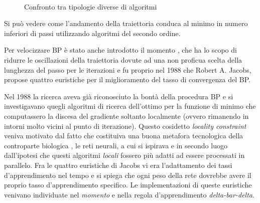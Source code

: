 \begin{figure}[hbtb]
\centering
{} \quad
{} \\
\caption{Confronto tra tipologie diverse di algoritmi}
\label{fig:subfig}
\end{figure}


Si può vedere come l'andamento della traiettoria conduca al minimo in numero inferiori di passi utilizzando algoritmi del secondo ordine.

Per velocizzare BP è stato anche introdotto il momento , che ha lo scopo di ridurre le oscillazioni della traiettoria dovute ad una non proficua scelta della lunghezza del passo per le iterazioni e fu proprio nel 1988 che Robert A. Jacobs, propose quattro euristiche per il miglioramento del tasso di convergenza del BP.

Nel 1988 la ricerca aveva già riconosciuto la bontà della procedura BP e si investigavano quegli algoritmi di ricerca dell'ottimo per la funzione di minimo che computassero la discesa del gradiente soltanto localmente (ovvero rimanendo in intorni molto vicini al punto di iterazione). Questo cosidetto \textit{locality constraint} veniva motivato dal fatto che costituiva una buona metafora tecnologica della controparte biologica , le reti neurali, a cui si ispirava e in secondo luogo dall'ipotesi che questi algoritmi \textit{locali} fossero più adatti ad essere processati in parallelo.
Fra le quattro euristiche di Jacobs vi era l'adattamento dei tassi d'apprendimento nel tempo e si spiega che ogni peso della rete dovrebbe avere il proprio tasso d'apprendimento specifico. Le implementazioni di queste euristiche venivano individuate nel \textit{momento} e nella regola d'apprendimento \textit{delta-bar-delta}.
